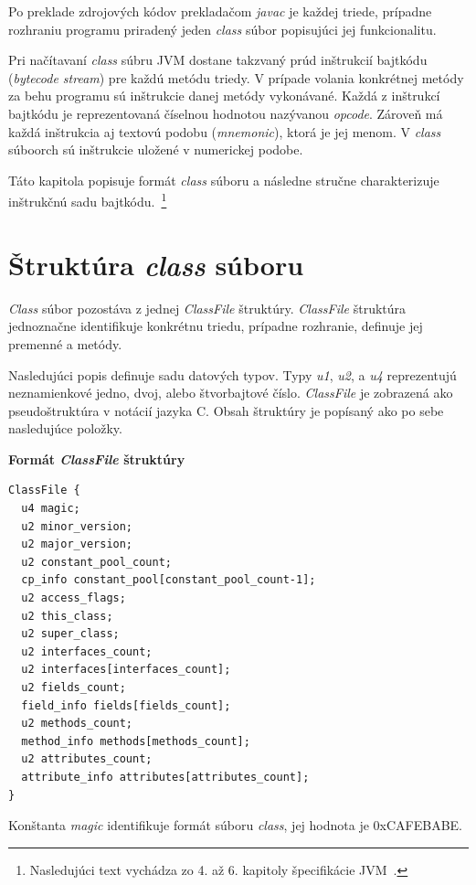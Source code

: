\documentclass[11pt,final,oneside]{fithesis}
\newenvironment{example}[1]
{
\vspace{3mm}
\noindent\textbf{#1}
\vspace{2mm}
}
{
\vspace{3mm}
}
\begin{document}
Po preklade zdrojových kódov prekladačom \textit{javac} je každej
triede, prípadne rozhraniu programu priradený jeden \textit{class} súbor
popisujúci jej funkcionalitu.

Pri načítavaní \textit{class} súbru JVM dostane takzvaný prúd inštrukcií
bajtkódu (\textit{bytecode stream}) pre každú metódu triedy. V prípade volania
konkrétnej metódy za behu programu sú inštrukcie danej metódy vykonávané.
Každá z inštrukcí bajtkódu je reprezentovaná číselnou hodnotou nazývanou
\textit{opcode}. Zároveň má každá inštrukcia aj textovú podobu (\textit
{mnemonic}), ktorá je jej menom. V \textit{class} súboorch sú
inštrukcie uložené v numerickej podobe.

Táto kapitola popisuje formát \textit{class} súboru a následne stručne
charakterizuje inštrukčnú sadu bajtkódu.~\footnote{Nasledujúci text vychádza 
zo 4. až 6. kapitoly špecifikácie JVM~\cite{Lindholm:2013:JVM:2462629}.}

\section{Štruktúra \textit{class} súboru}
\label{sec:classFile}
\textit{Class} súbor pozostáva z jednej \textit{ClassFile} štruktúry. \textit
{ClassFile} štruktúra jednoznačne identifikuje konkrétnu triedu, prípadne
rozhranie, definuje jej premenné a metódy.

Nasledujúci popis definuje sadu datových typov. Typy \textit {u1},
\textit {u2}, a \textit {u4} reprezentujú neznamienkové jedno, dvoj, alebo
štvorbajtové číslo. \textit {ClassFile} je zobrazená ako pseudoštruktúra v
notácií jazyka C. Obsah štruktúry je popísaný ako po sebe nasledujúce položky.

\begin{example}{Formát \textit{ClassFile} štruktúry}
\begin{verbatim}
ClassFile {
  u4 magic;
  u2 minor_version;
  u2 major_version;
  u2 constant_pool_count;
  cp_info constant_pool[constant_pool_count-1];
  u2 access_flags;
  u2 this_class;
  u2 super_class;
  u2 interfaces_count;
  u2 interfaces[interfaces_count];
  u2 fields_count;
  field_info fields[fields_count];
  u2 methods_count;
  method_info methods[methods_count];
  u2 attributes_count;
  attribute_info attributes[attributes_count];
}
\end{verbatim}
\end{example}

Konštanta \textit{magic} identifikuje formát súboru \textit{class},
jej hodnota je 0xCAFEBABE.
\end{document}
